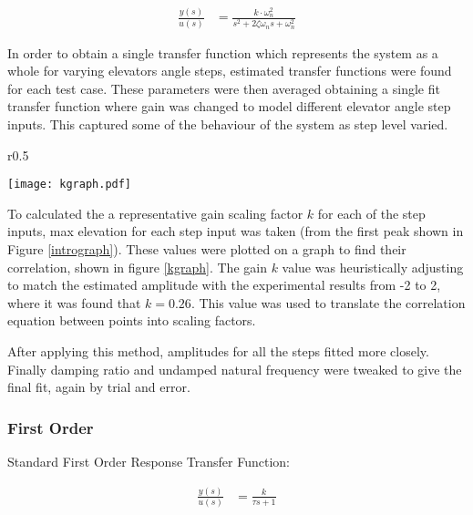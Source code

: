 \begin{align}
\frac{ y(s) }{ u(s) } &=\frac{ k\cdot \omega_{ n }^{ 2 } }{ s^{ 2 }+2\zeta \omega_{ n }s+\omega_{ n }^{ 2 } } \label{2otf}
\end{align}

In order to obtain a single transfer function which represents the
system as a whole for varying elevators angle steps, estimated transfer
functions were found for each test case. These parameters were then
averaged obtaining a single fit transfer function where gain was changed
to model different elevator angle step inputs. This captured some of the
behaviour of the system as step level varied.

\begin{wrapfigure}{r}{0.5\textwidth}
  \begin{center}
  \vspace{-20pt}
\texttt{[image: kgraph.pdf]}  
\end{center}
\caption{Graph Finding the Gain For Each Step Input}
\label{kgraph}
  \vspace{-15pt}
\end{wrapfigure}

To calculated the a representative gain scaling factor \(k\) for each of
the step inputs, max elevation for each step input was taken (from the
first peak shown in Figure \ref{intrograph}). These values were plotted
on a graph to find their correlation, shown in figure \ref{kgraph}. The
gain \(k\) value was heuristically adjusting to match the estimated
amplitude with the experimental results from -2 to 2, where it was found
that \(k = 0.26\). This value was used to translate the correlation
equation between points into scaling factors.

After applying this method, amplitudes for all the steps fitted more
closely. Finally damping ratio and undamped natural frequency were
tweaked to give the final fit, again by trial and error.

\subsubsection{First Order}\label{first-order}

Standard First Order Response Transfer Function:

\begin{align}
 \frac { y(s) }{ u(s) } &=\frac { k }{ \tau s+1 }
\label{fos}
\end{align}


